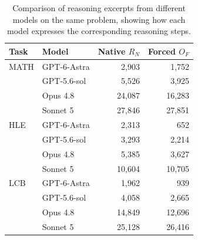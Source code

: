 \begin{table}[t]
\centering
\caption{Comparison of reasoning excerpts from different models on the same problem, showing how each model expresses the corresponding reasoning steps.}
\label{tab:closed-lengths}
\scriptsize
\setlength{\tabcolsep}{5pt}
\begin{tabular}{llrr}
\toprule
Task & Model & Native $R_N$ & Forced $O_F$ \\
\midrule
MATH & GPT-6-Astra & 2,903 & 1,752 \\
 & GPT-5.6-sol & 5,526 & 3,925 \\
 & Opus 4.8 & 24,087 & 16,283 \\
 & Sonnet 5 & 27,846 & 27,851 \\
\midrule
HLE & GPT-6-Astra & 2,313 & 652 \\
 & GPT-5.6-sol & 3,293 & 2,214 \\
 & Opus 4.8 & 5,385 & 3,627 \\
 & Sonnet 5 & 10,604 & 10,705 \\
\midrule
LCB & GPT-6-Astra & 1,962 & 939 \\
 & GPT-5.6-sol & 4,058 & 2,665 \\
 & Opus 4.8 & 14,849 & 12,696 \\
 & Sonnet 5 & 25,128 & 26,416 \\
\bottomrule
\end{tabular}
\end{table}
